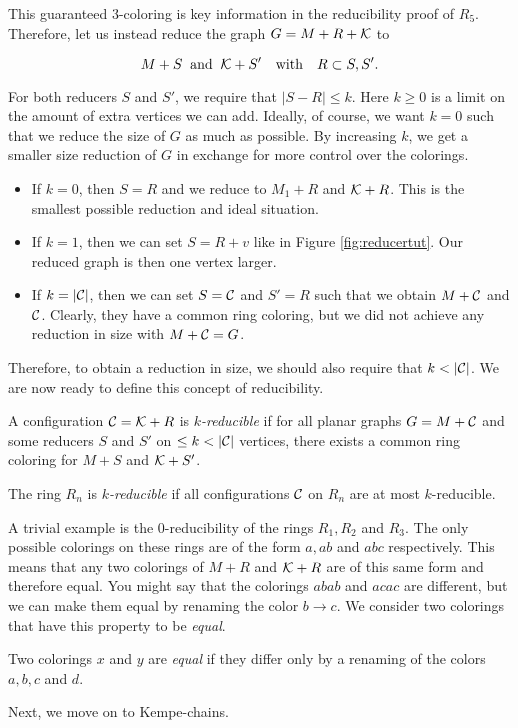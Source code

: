 This guaranteed 3-coloring is key information in the reducibility proof of $R_5$. Therefore, let us instead reduce the graph $G=M+R+\mathcal{K}$ to

\begin{equation}
    M+S \;\;\text{and}\;\; \mathcal{K}+S' \quad \text{with} \quad R \subset S,S'.
\end{equation}

For both reducers $S$ and $S'$, we require that $|S-R| \leq k$. Here $k \geq 0$ is a limit on the amount of extra vertices we can add. Ideally, of course, we want $k=0$ such that we reduce the size of $G$ as much as possible. By increasing $k$, we get a smaller size reduction of $G$ in exchange for more control over the colorings.

\begin{itemize}
    \item If $k=0$, then $S=R$ and we reduce to $M_1+R$ and $\mathcal{K}+R$. This is the smallest possible reduction and ideal situation.
    \item If $k=1$, then we can set $S=R+v$ like in Figure \ref{fig:reducertut}. Our reduced graph is then one vertex larger.
    \item If $k = |\mathcal{C}|$, then we can set $S = \mathcal{C}$ and $S' = R$ such that we obtain $M+\mathcal{C}$ and $\mathcal{C}$. Clearly, they have a common ring coloring, but we did not achieve any reduction in size with $M+\mathcal{C} = G$. 
\end{itemize}

Therefore, to obtain a reduction in size, we should also require that $k < |\mathcal{C}|$. We are now ready to define this concept of reducibility.

\begin{definition}
    A configuration $\mathcal{C}=\mathcal{K}+R$ is \emph{$k$-reducible} if for all planar graphs $G=M+\mathcal{C}$ and some reducers $S$ and $S'$ on $\leq k < |\mathcal{C}|$ vertices, there exists a common ring coloring for $M+S$ and $\mathcal{K}+S'$.
\end{definition}
\begin{definition}
    The ring $R_n$ is \emph{$k$-reducible} if all configurations $\mathcal{C}$ on $R_n$ are at most $k$-reducible.
\end{definition}

A trivial example is the 0-reducibility of the rings $R_1, R_2$ and $R_3$. The only possible colorings on these rings are of the form $ a, ab$ and $ abc$ respectively. This means that any two colorings of $M+R$ and $\mathcal{K} + R$ are of this same form and therefore equal. You might say that the colorings $abab$ and $acac$ are different, but we can make them equal by renaming the color $b\rightarrow c$. We consider two colorings that have this property to be \textit{equal}.

\begin{definition}
    \label{def:coleq}
    Two colorings $x$ and $y$ are \emph{equal} if they differ only by a renaming of the colors $a,b,c$ and $d$. 
\end{definition}

Next, we move on to Kempe-chains.
